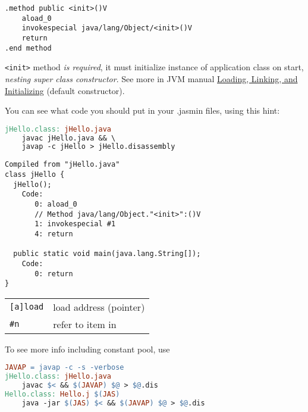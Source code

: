 \begin{lstlisting}
.method public <init>()V
	aload_0
	invokespecial java/lang/Object/<init>()V
	return
.end method
\end{lstlisting}
\verb|<init>|  method \emph{is required}, it must initialize
instance of application class on start, \emph{nesting super class constructor}.
See more in JVM manual
\href{https://docs.oracle.com/javase/specs/jvms/se7/html/jvms-5.html}{Loading, Linking, and Initializing}
(default constructor).

\medskip
You can see what code you should put in your .jasmin files, using this hint:
\begin{lstlisting}[language=make,title=java/Makefile]
jHello.class: jHello.java
	javac jHello.java && \
	javap -c jHello > jHello.disassembly
\end{lstlisting}

\begin{lstlisting}[title=java/jHello.disassembly]
Compiled from "jHello.java"
class jHello {
  jHello();
    Code:
       0: aload_0
       // Method java/lang/Object."<init>":()V
       1: invokespecial #1                  
       4: return

  public static void main(java.lang.String[]);
    Code:
       0: return
}
\end{lstlisting}

\begin{tabular}{l l}
\verb|[a]load| & load address (pointer) \\
\verb|#n| & refer to item in \term{constants pool}\\
\end{tabular}

\medskip\noindent
To see more info including constant pool, use
\begin{lstlisting}[language=make,title=java/Makefile]
JAVAP = javap -c -s -verbose
jHello.class: jHello.java
	javac $< && $(JAVAP) $@ > $@.dis
Hello.class: Hello.j $(JAS)
	java -jar $(JAS) $< && $(JAVAP) $@ > $@.dis
\end{lstlisting}


% 
